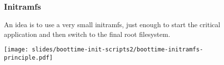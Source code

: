 \begin{frame}
\frametitle{Initramfs}
An idea is to use a very small initramfs, just enough to start the critical
application and then switch to the final root filesystem.
\begin{center}
    \texttt{[image: slides/boottime-init-scripts2/boottime-initramfs-principle.pdf]}
\end{center}
\end{frame}
